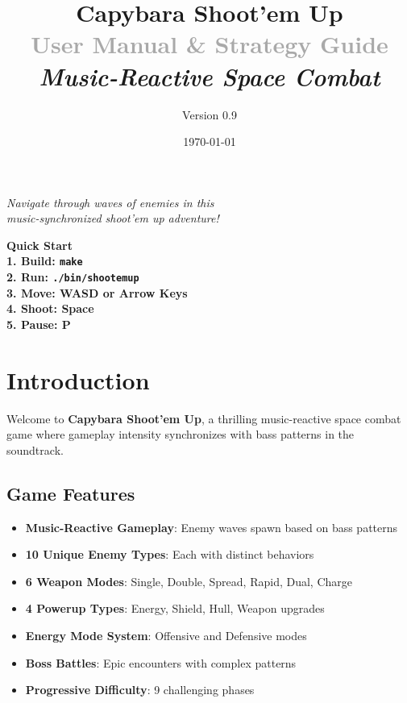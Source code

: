 \documentclass[11pt,a4paper]{article}
\title{
    \Huge\textbf{\textcolor{primarycolor}{Capybara Shoot'em Up}}\\
    \vspace{0.5cm}
    \Large\textcolor{darkgray}{User Manual \& Strategy Guide}\\
    \vspace{0.3cm}
    \large\textit{Music-Reactive Space Combat}
}
\author{Version 0.9}
\date{\today}
\newcommand{\infobox}[2]{%
    \vspace{0.3cm}
    \noindent\colorbox{#1!10}{%
        \parbox{\dimexpr\textwidth-2\fboxsep}{%
            \textcolor{#1}{\textbf{#2}}
        }
    }
    \vspace{0.3cm}
}
\begin{document}
\maketitle
\thispagestyle{empty}

\begin{center}
\Large\textit{Navigate through waves of enemies in this\\
music-synchronized shoot'em up adventure!}

\vspace{1cm}

\infobox{infocolor}{\textbf{Quick Start}\\
1. Build: \texttt{make}\\
2. Run: \texttt{./bin/shootemup}\\
3. Move: \textbf{WASD} or \textbf{Arrow Keys}\\
4. Shoot: \textbf{Space}\\
5. Pause: \textbf{P}}
\end{center}

\newpage
\tableofcontents
\newpage

\section{Introduction}

Welcome to \textbf{Capybara Shoot'em Up}, a thrilling music-reactive space combat game where gameplay intensity synchronizes with bass patterns in the soundtrack.

\subsection{Game Features}

\begin{itemize}
    \item \textbf{Music-Reactive Gameplay}: Enemy waves spawn based on bass patterns
    \item \textbf{10 Unique Enemy Types}: Each with distinct behaviors
    \item \textbf{6 Weapon Modes}: Single, Double, Spread, Rapid, Dual, Charge
    \item \textbf{4 Powerup Types}: Energy, Shield, Hull, Weapon upgrades
    \item \textbf{Energy Mode System}: Offensive and Defensive modes
    \item \textbf{Boss Battles}: Epic encounters with complex patterns
    \item \textbf{Progressive Difficulty}: 9 challenging phases
\end{itemize}
\end{document}
